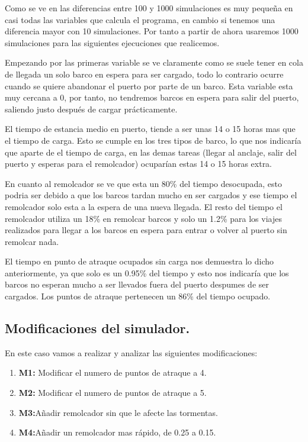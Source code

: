 \documentclass[]{article}
\begin{document}
Como se ve en las diferencias entre 100 y 1000 simulaciones es muy pequeña en casi todas las variables que calcula el programa, en cambio si tenemos una diferencia mayor con 10 simulaciones. Por tanto a partir de ahora usaremos 1000 simulaciones para las siguientes ejecuciones que realicemos. 

Empezando por las primeras variable se ve claramente como se suele tener en cola de llegada un solo barco en espera para ser cargado, todo lo contrario ocurre cuando se quiere abandonar el puerto por parte de un barco. Esta variable esta muy cercana a 0, por tanto, no tendremos barcos en espera para salir del puerto, saliendo justo después de cargar prácticamente. 

El tiempo de estancia medio en puerto, tiende a ser unas 14 o 15 horas mas que el tiempo de carga. Esto se cumple en los tres tipos de barco, lo que nos indicaría que aparte de el tiempo de carga, en las demas tareas (llegar al anclaje, salir del puerto y esperas para el remolcador) ocuparían estas 14 o 15 horas extra.

En cuanto al remolcador se ve que esta un 80\% del tiempo desocupada, esto podria ser debido a que los barcos tardan mucho en ser cargados y ese tiempo el remolcador solo esta a la espera de una nueva llegada. El resto del tiempo el remolcador utiliza un 18\% en remolcar barcos y solo un 1.2\% para los viajes realizados para llegar a los barcos en espera para entrar o volver al puerto sin remolcar nada. 

El tiempo en punto de atraque ocupados sin carga nos demuestra lo dicho anteriormente, ya que solo es un 0.95\% del tiempo y esto nos indicaría que los barcos no esperan mucho a ser llevados fuera del puerto despumes de ser cargados. 
Los puntos de atraque pertenecen un 86\% del tiempo ocupado. 

\subsection{Modificaciones del simulador.}
En este caso vamos a realizar y analizar las siguientes modificaciones:
\begin{enumerate}
	\item \textbf{M1:} Modificar el numero de puntos de atraque a 4.
	\item \textbf{M2:} Modificar el numero de puntos de atraque a 5.
	\item \textbf{M3:}Añadir remolcador sin que le afecte las tormentas.
	\item \textbf{M4:}Añadir un remolcador mas rápido, de 0.25 a 0.15.
\end{enumerate}
\end{document}
